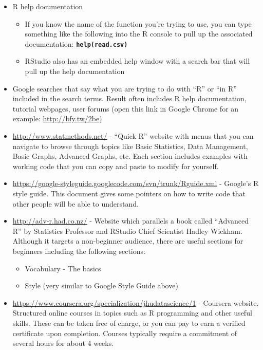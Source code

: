\documentclass[]{article}
\begin{document}
\begin{itemize}
\itemsep1pt\parskip0pt
\item
  R help documentation

  \begin{itemize}
  \itemsep1pt\parskip0pt
  \item
    If you know the name of the function you're trying to use, you can
    type something like the following into the R console to pull up the
    associated documentation: \textbf{\texttt{help(read.csv)}}
  \item
    RStudio also has an embedded help window with a search bar that will
    pull up the help documentation
  \end{itemize}
\item
  Google searches that say what you are trying to do with ``R'' or ``in
  R'' included in the search terms. Result often includes R help
  documentation, tutorial webpages, user forums (open this link in
  Google Chrome for an example: \url{http://bfy.tw/2be})
\item
  \url{http://www.statmethods.net/} - ``Quick R'' website with menus
  that you can navigate to browse through topics like Basic Statistics,
  Data Management, Basic Graphs, Advanced Graphs, etc. Each section
  includes examples with working code that you can copy and paste to
  modify for yourself.
\item
  \url{https://google-styleguide.googlecode.com/svn/trunk/Rguide.xml} -
  Google's R style guide. This document gives some pointers on how to
  write code that other people will be able to understand.
\item
  \url{http://adv-r.had.co.nz/} - Website which parallels a book called
  ``Advanced R'' by Statistics Professor and RStudio Chief Scientist
  Hadley Wickham. Although it targets a non-beginner audience, there are
  useful sections for beginners including the following sections:

  \begin{itemize}
  \itemsep1pt\parskip0pt
  \item
    Vocabulary - The basics
  \item
    Style (very similar to Google Style Guide above)
  \end{itemize}
\item
  \url{https://www.coursera.org/specialization/jhudatascience/1} -
  Coursera website. Structured online courses in topics such as R
  programming and other useful skills. These can be taken free of
  charge, or you can pay to earn a verified certificate upon completion.
  Courses typically require a commitment of several hours for about 4
  weeks.
\end{itemize}
\end{document}
